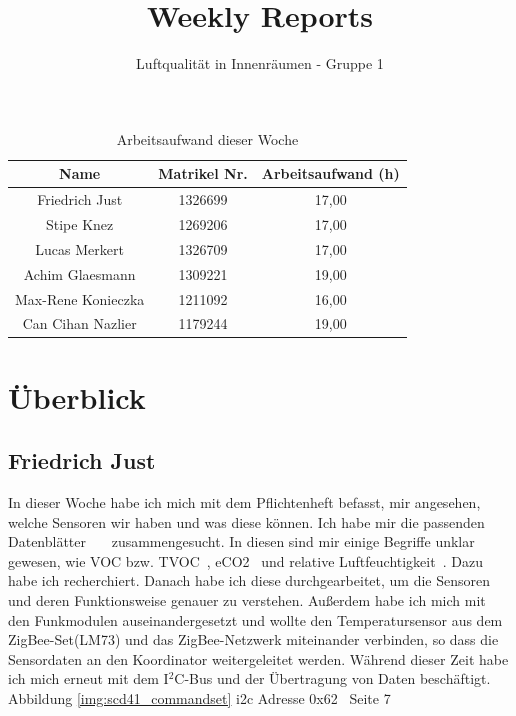 \documentclass[]{article}
\title{Weekly Reports}
\author{Luftqualität in Innenräumen - Gruppe 1}
\begin{document}
\maketitle

\begin{table}[h!]
	\centering
	\begin{tabular}{|c|c|c|}
		\hline
		{\textbf{Name}}				&		{\textbf{Matrikel Nr.}} & {\textbf{Arbeitsaufwand (h)}} \\
		\hline
		Friedrich Just				&		1326699 				&	17,00	\\
		\hline
		Stipe Knez				&		1269206 				&	17,00	\\
		\hline
		Lucas Merkert				&		1326709					&	17,00	\\
		\hline
		Achim Glaesmann				&		1309221					&	19,00	\\
		\hline
		Max-Rene Konieczka			&		1211092					&	16,00	\\
		\hline
		Can Cihan Nazlier			&		1179244					&	19,00	\\
		\hline
	\end{tabular}
	\caption{Arbeitsaufwand dieser Woche}
	\label{tab:worakload}
\end{table}



\section{Überblick}


\subsection{Friedrich Just}
In dieser Woche habe ich mich mit dem Pflichtenheft befasst, mir angesehen, welche Sensoren wir haben und was diese können. Ich habe mir die passenden Datenblätter~\cite{datasheetcss811}~\cite{datasheetscd41}~\cite{datasheetsht21} zusammengesucht. In diesen sind mir einige Begriffe unklar gewesen, wie VOC bzw. TVOC~\cite{tvoc}, eCO2~\cite{eco2} und relative Luftfeuchtigkeit~\cite{realtiveluftfeuchtigkeit}. Dazu habe ich recherchiert. Danach habe ich diese durchgearbeitet, um die Sensoren und deren Funktionsweise genauer zu verstehen. Außerdem habe ich mich mit den Funkmodulen auseinandergesetzt und wollte den Temperatursensor aus dem ZigBee-Set(LM73) und das ZigBee-Netzwerk miteinander verbinden, so dass die Sensordaten an den Koordinator weitergeleitet werden. Während dieser Zeit habe ich mich erneut mit dem I$^2$C-Bus und der Übertragung von Daten beschäftigt.
{Abbildung \ref{img:scd41_commandset}}
i2c Adresse 0x62 ~\cite{datasheetscd41}Seite 7
\end{document}
